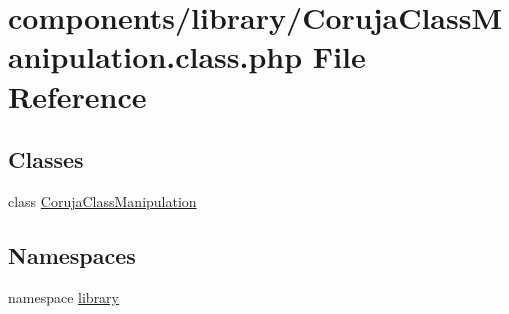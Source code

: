\hypertarget{_coruja_class_manipulation_8class_8php}{
\section{components/library/CorujaClassManipulation.class.php File Reference}
\label{_coruja_class_manipulation_8class_8php}
}
\subsection*{Classes}
\begin{CompactItemize}
\item 
class \hyperlink{class_coruja_class_manipulation}{CorujaClassManipulation}
\end{CompactItemize}
\subsection*{Namespaces}
\begin{CompactItemize}
\item 
namespace \hyperlink{namespacelibrary}{library}
\end{CompactItemize}
